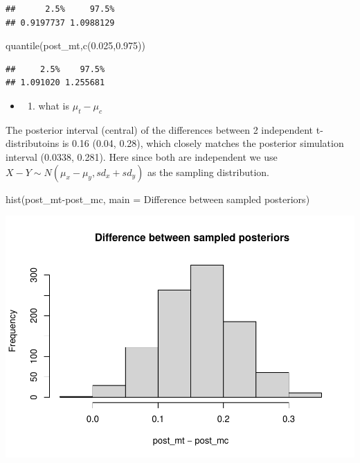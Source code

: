 \documentclass[
]{book}
\newenvironment{Shaded}{\begin{snugshade}}{\end{snugshade}}
\newcommand{\AttributeTok}[1]{\textcolor[rgb]{0.77,0.63,0.00}{#1}}
\newcommand{\FloatTok}[1]{\textcolor[rgb]{0.00,0.00,0.81}{#1}}
\newcommand{\FunctionTok}[1]{\textcolor[rgb]{0.00,0.00,0.00}{#1}}
\newcommand{\NormalTok}[1]{#1}
\newcommand{\SpecialCharTok}[1]{\textcolor[rgb]{0.00,0.00,0.00}{#1}}
\newcommand{\StringTok}[1]{\textcolor[rgb]{0.31,0.60,0.02}{#1}}
\providecommand{\tightlist}{%
  \setlength{\itemsep}{0pt}\setlength{\parskip}{0pt}}
\theoremstyle{definition}
\theoremstyle{definition}
\theoremstyle{definition}
\theoremstyle{definition}
\theoremstyle{remark}
\begin{document}
\begin{verbatim}
##      2.5%     97.5% 
## 0.9197737 1.0988129
\end{verbatim}

\begin{Shaded}
\begin{Highlighting}[]
        \FunctionTok{quantile}\NormalTok{(post\_mt,}\FunctionTok{c}\NormalTok{(}\FloatTok{0.025}\NormalTok{,}\FloatTok{0.975}\NormalTok{))}
\end{Highlighting}
\end{Shaded}

\begin{verbatim}
##     2.5%    97.5% 
## 1.091020 1.255681
\end{verbatim}

\begin{itemize}
\item
  \begin{enumerate}
  \def\labelenumi{(\alph{enumi})}
  \setcounter{enumi}{1}
  \tightlist
  \item
    what is \(\mu_t - \mu_c\)
  \end{enumerate}
\end{itemize}

The posterior interval (central) of the differences between 2 independent t-distributoins is 0.16 (0.04, 0.28), which closely matches the posterior simulation interval (0.0338, 0.281). Here since both are independent we use \(X-Y\sim N(\mu_x-\mu_y, sd_x+sd_y)\) as the sampling distribution.

\begin{Shaded}
\begin{Highlighting}[]
 \FunctionTok{hist}\NormalTok{(post\_mt}\SpecialCharTok{{-}}\NormalTok{post\_mc, }\AttributeTok{main =} \StringTok{\textquotesingle{} Difference between sampled posteriors\textquotesingle{}}\NormalTok{)}
\end{Highlighting}
\end{Shaded}

\includegraphics{_main_files/figure-latex/unnamed-chunk-32-1.pdf}
\end{document}
